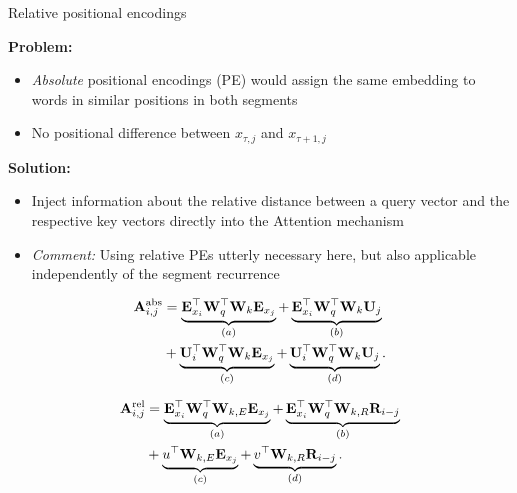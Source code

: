 \documentclass[11pt,compress,t,notes=noshow, xcolor=table]{beamer}
\begin{document}

\begin{vbframe}{Relative positional encodings}

\vfill

\textbf{Problem:}

\begin{itemize}
	\item \textit{Absolute} positional encodings (PE) would assign the same embedding to words in similar positions in both segments
	\item No positional difference between $x_{\tau,j}$ and $x_{\tau+1,j}$
\end{itemize}

\textbf{Solution:}

\begin{itemize}
	\item Inject information about the relative distance between a query vector and the respective key vectors directly into the Attention mechanism
	\item \textit{Comment:} Using relative PEs utterly necessary here, but also applicable independently of the segment recurrence
\end{itemize}

\begin{align*}
	\rmA_{i,j}^\text{abs} 
	&= \underbrace{ \rmE_{x_i}^\top \rmW_q^\top \rmW_k \rmE_{x_j} }_{(a)}
	+ \underbrace{\rmE_{x_i}^\top \rmW_q^\top \rmW_k \rmU_{j}}_{(b)} \\
	&+ \underbrace{\rmU_{i}^\top \rmW_q^\top \rmW_k \rmE_{x_j}}_{(c)}
	+ \underbrace{\rmU_{i}^\top \rmW_q^\top \rmW_k \rmU_{j}}_{(d)}. \vspace{-0.5em}
\end{align*}

\begin{align*}
	{\mathbf{A}}_{i,j}^\text{rel}
	&= \underbrace{ {\mathbf{E}}_{x_i}^\top {\mathbf{W}}_q^\top {\mathbf{W}}_{k,E} {\mathbf{E}}_{x_j} }_{(a)}
	+ \underbrace{{\mathbf{E}}_{x_i}^\top {\mathbf{W}}_q^\top {\mathbf{W}}_{k,R} {\mathbf{R}}_{i-j} }_{(b)} \\
	&+ \underbrace{u^\top {\mathbf{W}}_{k,E} {\mathbf{E}}_{x_j}}_{(c)}
	+ \underbrace{v^\top {\mathbf{W}}_{k,R} {\mathbf{R}}_{i-j}}_{(d)}.
\end{align*}

\end{vbframe}

\end{document}
